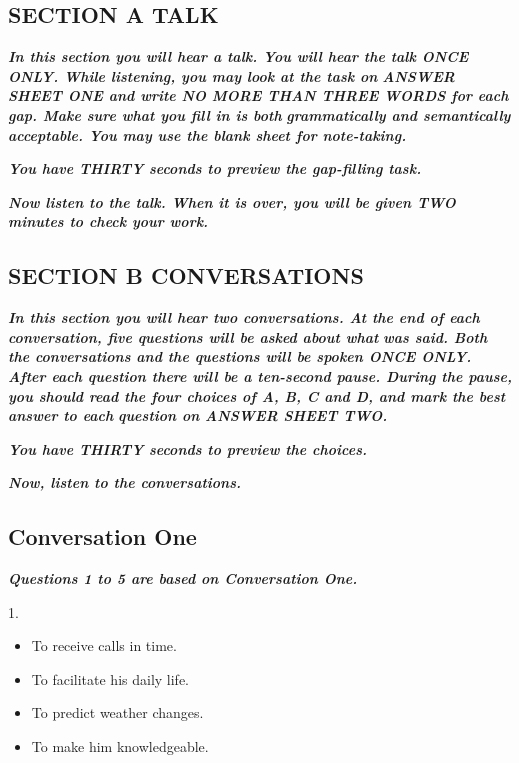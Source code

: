 \documentclass[UTF8,11pt]{ctexart}
\begin{document}
\subsection*{\textbf{SECTION A TALK}}


\textbf{\textit{In this section you will hear a talk. You will hear the talk ONCE ONLY. While listening, you may look at the task on}} \textbf{\textit{ANSWER SHEET ONE and write NO MORE THAN THREE WORDS for each gap. Make sure what you fill in is both}} \textbf{\textit{grammatically and semantically acceptable. You may use the blank sheet for note-taking.}}


\textbf{\textit{You have THIRTY seconds to preview the gap-filling task.}}


\textbf{\textit{Now listen to the talk. When it is over, you will be given TWO minutes to check your work.}}


\subsection*{\textbf{SECTION B CONVERSATIONS}}


\textbf{\textit{In this section you will hear two conversations. At the end of each conversation, five questions will be asked about what}} \textbf{\textit{was said. Both the conversations and the questions will be spoken ONCE ONLY. After each question there will be a ten-second pause. During the pause, you should read the four choices of A, B, C and D, and mark the best answer to each}} \textbf{\textit{question on ANSWER SHEET TWO.}}


\textbf{\textit{You have THIRTY seconds to preview the choices.}}


\textbf{\textit{Now, listen to the conversations.}}


\subsection*{\textbf{Conversation One}}


\textbf{\textit{Questions 1 to 5 are based on Conversation One.}}


1.


\begin{itemize}[leftmargin=2em,itemsep=.2em,topsep=.4em]\item[A.] To receive calls in time.
\item[B.] To facilitate his daily life.
\item[C.] To predict weather changes.
\item[D.] To make him knowledgeable.
\end{itemize}
\end{document}
